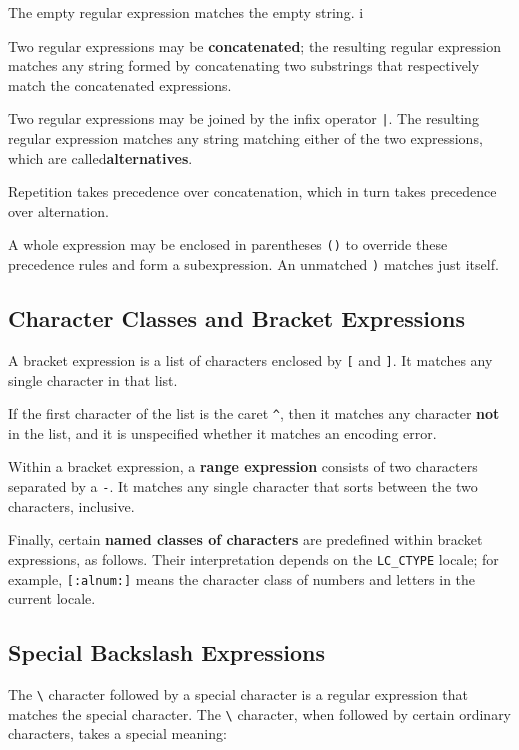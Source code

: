 The empty regular expression matches the empty string. i

Two regular expressions may be {\bf concatenated}; the resulting regular expression
matches any string formed by concatenating two substrings that respectively
match the concatenated expressions.

Two regular expressions may be joined by the infix operator \verb+|+. The
resulting regular expression matches any string matching either of the two
expressions, which are called{\bf  alternatives}.

Repetition takes precedence over concatenation, which in turn takes precedence
over alternation. 

A whole expression may be enclosed in parentheses
\verb+()+ to override these precedence rules and form a subexpression. An
unmatched \verb+)+ matches just itself. 

\subsection{Character Classes and Bracket Expressions}

A bracket expression is a list of characters enclosed by \verb+[+ and
\verb+]+. It matches any single character in that list. 

If the first character of the list is the caret \verb+^+, then it matches any
character {\bf not} in the list, and it is unspecified whether it matches an encoding error. 

Within a bracket expression, a {\bf range expression} consists of two
characters separated by a \verb+-+. It matches any single character that sorts
between the two characters, inclusive.


Finally, certain {\bf named classes of characters} are predefined within bracket
expressions, as follows. Their interpretation depends on the \verb+LC_CTYPE+ locale;
for example, \verb+[:alnum:]+ means the character class of numbers and letters in
the current locale. 

\subsection{Special Backslash Expressions}

The \verb+\+ character followed by a special character is a regular expression
that matches the special character. The \verb+\+ character, when followed by
certain ordinary characters, takes a special meaning:

